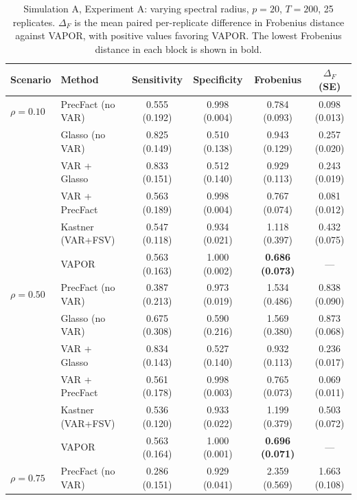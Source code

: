 
\begin{table}[h!]
\centering
\small
\setlength{\tabcolsep}{4pt}
\caption{Simulation A, Experiment A: varying spectral radius, $p=20$, $T=200$, 25 replicates. $\Delta_F$ is the mean paired per-replicate difference in Frobenius distance against VAPOR, with positive values favoring VAPOR. The lowest Frobenius distance in each block is shown in bold.}
\label{tab:sim-a-autocorr}
\begin{tabular}{llcccc}
\toprule
Scenario & Method & Sensitivity & Specificity & Frobenius & $\Delta_F$ (SE) \\
\midrule
$\rho = 0.10$ & PrecFact (no VAR)  & 0.555 (0.192) & 0.998 (0.004) & 0.784 (0.093) & 0.098 (0.013) \\
              & Glasso (no VAR)    & 0.825 (0.149) & 0.510 (0.138) & 0.943 (0.129) & 0.257 (0.020) \\
              & VAR + Glasso       & 0.833 (0.151) & 0.512 (0.140) & 0.929 (0.113) & 0.243 (0.019) \\
              & VAR + PrecFact     & 0.563 (0.189) & 0.998 (0.004) & 0.767 (0.074) & 0.081 (0.012) \\
              & Kastner (VAR+FSV)  & 0.547 (0.118) & 0.934 (0.021) & 1.118 (0.397) & 0.432 (0.075) \\
              & VAPOR              & 0.563 (0.163) & 1.000 (0.002) & \textbf{0.686 (0.073)} & --- \\
\midrule
$\rho = 0.50$ & PrecFact (no VAR)  & 0.387 (0.213) & 0.973 (0.019) & 1.534 (0.486) & 0.838 (0.090) \\
              & Glasso (no VAR)    & 0.675 (0.308) & 0.590 (0.216) & 1.569 (0.380) & 0.873 (0.068) \\
              & VAR + Glasso       & 0.834 (0.143) & 0.527 (0.140) & 0.932 (0.113) & 0.236 (0.017) \\
              & VAR + PrecFact     & 0.561 (0.178) & 0.998 (0.003) & 0.765 (0.073) & 0.069 (0.011) \\
              & Kastner (VAR+FSV)  & 0.536 (0.120) & 0.933 (0.022) & 1.199 (0.379) & 0.503 (0.072) \\
              & VAPOR              & 0.563 (0.164) & 1.000 (0.001) & \textbf{0.696 (0.071)} & --- \\
\midrule
$\rho = 0.75$ & PrecFact (no VAR)  & 0.286 (0.151) & 0.929 (0.041) & 2.359 (0.569) & 1.663 (0.108) \\

\end{tabular}
\end{table}
